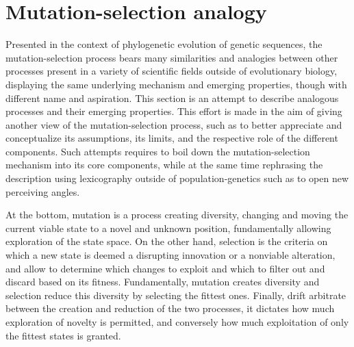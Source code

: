 \begin{table}[H]
    \centering
    \noindent{}
    \caption[Parameter of mutation-selection processes]{Parameter of mutation-selection processes}
    \label{table:params-mutsel}
\end{table}


\section{Mutation-selection analogy}
Presented in the context of phylogenetic evolution of genetic sequences, the mutation-selection process bears many similarities and analogies between other processes present in a variety of scientific fields outside of evolutionary biology, displaying the same underlying mechanism and emerging properties, though with different name and aspiration.
This section is an attempt to describe analogous processes and their emerging properties.
This effort is made in the aim of giving another view of the mutation-selection process, such as to better appreciate and conceptualize its assumptions, its limits, and the respective role of the different components.
Such attempts requires to boil down the mutation-selection mechanism into its core components, while at the same time rephrasing the description using lexicography outside of population-genetics such as to open new perceiving angles.

At the bottom, mutation is a process creating diversity, changing and moving the current viable state to a novel and unknown position, fundamentally allowing exploration of the state space.
On the other hand, selection is the criteria on which a new state is deemed a disrupting innovation or a nonviable alteration, and allow to determine which changes to exploit and which to filter out and discard based on its fitness.
Fundamentally, mutation creates diversity and selection reduce this diversity by selecting the fittest ones.
Finally, drift arbitrate between the creation and reduction of the two processes, it dictates how much exploration of novelty is permitted, and conversely how much exploitation of only the fittest states is granted.

